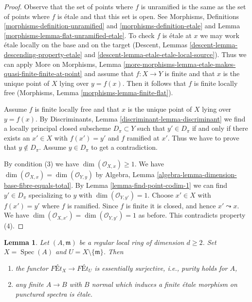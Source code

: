 \documentclass{stacks-project}
\theoremstyle{plain}
\newtheorem{lemma}[subsection]{Lemma}
\theoremstyle{definition}
\theoremstyle{remark}
\numberwithin{equation}{subsection}
\def\Spec{\mathop{\mathrm{Spec}}}
\begin{document}
\begin{proof}
Observe that the set of points where $f$ is unramified is the same as
the set of points where $f$ is \'etale and that this set is open.
See Morphisms, Definitions \ref{morphisms-definition-unramified}
and \ref{morphisms-definition-etale} and
Lemma \ref{morphisms-lemma-flat-unramified-etale}.
To check $f$ is \'etale at $x$ we may work \'etale
locally on the base and on the
target (Descent, Lemmas \ref{descent-lemma-descending-property-etale} and
\ref{descent-lemma-etale-etale-local-source}).
Thus we can apply More on Morphisms, Lemma
\ref{more-morphisms-lemma-etale-makes-quasi-finite-finite-at-point}
and assume that $f : X \to Y$ is finite and that $x$ is the unique
point of $X$ lying over $y = f(x)$.
Then it follows that $f$ is finite locally free
(Morphisms, Lemma \ref{morphisms-lemma-finite-flat}).

\medskip\noindent
Assume $f$ is finite locally free and that $x$ is the unique point of
$X$ lying over $y = f(x)$. By
Discriminants, Lemma \ref{discriminant-lemma-discriminant}
we find a locally principal closed subscheme $D_\pi \subset Y$
such that $y' \in D_\pi$ if and only if there exists an $x' \in X$
with $f(x') = y'$ and $f$ ramified at $x'$. Thus we have to prove
that $y \not \in D_\pi$. Assume $y \in D_\pi$ to get a contradiction.

\medskip\noindent
By condition (3) we have $\dim(\mathcal{O}_{X, x}) \geq 1$.
We have $\dim(\mathcal{O}_{X, x}) = \dim(\mathcal{O}_{Y, y})$ by
Algebra, Lemma \ref{algebra-lemma-dimension-base-fibre-equals-total}.
By Lemma \ref{lemma-find-point-codim-1}
we can find $y' \in D_\pi$ specializing to $y$
with $\dim(\mathcal{O}_{Y, y'}) = 1$.
Choose $x' \in X$ with $f(x') = y'$ where $f$ is ramified. Since $f$
is finite it is closed, and hence $x' \leadsto x$.
We have $\dim(\mathcal{O}_{X, x'}) = \dim(\mathcal{O}_{Y, y'}) = 1$
as before. This contradicts property (4).
\end{proof}

\begin{lemma}
\label{lemma-local-purity}
Let $(A, \mathfrak m)$ be a regular local ring of dimension $d \geq 2$.
Set $X = \Spec(A)$ and $U = X \setminus \{\mathfrak m\}$. Then
\begin{enumerate}
\item the functor $\textit{F\'Et}_X \to \textit{F\'Et}_U$
is essentially surjective, i.e., purity holds for $A$,
\item any finite $A \to B$ with $B$ normal which
induces a finite \'etale morphism on punctured spectra is \'etale.
\end{enumerate}
\end{lemma}
\end{document}
